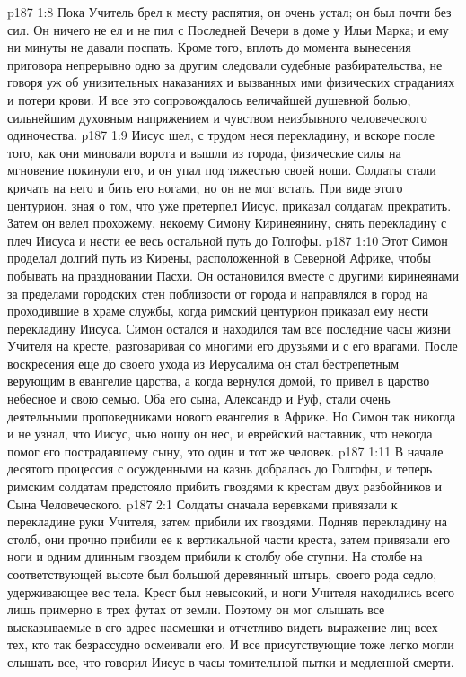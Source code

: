 \vs p187 1:8 Пока Учитель брел к месту распятия, он очень устал; он был почти без сил. Он ничего не ел и не пил с Последней Вечери в доме у Ильи Марка; и ему ни минуты не давали поспать. Кроме того, вплоть до момента вынесения приговора непрерывно одно за другим следовали судебные разбирательства, не говоря уж об унизительных наказаниях и вызванных ими физических страданиях и потери крови. И все это сопровождалось величайшей душевной болью, сильнейшим духовным напряжением и чувством неизбывного человеческого одиночества.
\vs p187 1:9 Иисус шел, с трудом неся перекладину, и вскоре после того, как они миновали ворота и вышли из города, физические силы на мгновение покинули его, и он упал под тяжестью своей ноши. Солдаты стали кричать на него и бить его ногами, но он не мог встать. При виде этого центурион, зная о том, что уже претерпел Иисус, приказал солдатам прекратить. Затем он велел прохожему, некоему Симону Киринеянину, снять перекладину с плеч Иисуса и нести ее весь остальной путь до Голгофы.
\vs p187 1:10 \pc Этот Симон проделал долгий путь из Кирены, расположенной в Северной Африке, чтобы побывать на праздновании Пасхи. Он остановился вместе с другими киринеянами за пределами городских стен поблизости от города и направлялся в город на проходившие в храме службы, когда римский центурион приказал ему нести перекладину Иисуса. Симон остался и находился там все последние часы жизни Учителя на кресте, разговаривая со многими его друзьями и с его врагами. После воскресения еще до своего ухода из Иерусалима он стал бестрепетным верующим в евангелие царства, а когда вернулся домой, то привел в царство небесное и свою семью. Оба его сына, Александр и Руф, стали очень деятельными проповедниками нового евангелия в Африке. Но Симон так никогда и не узнал, что Иисус, чью ношу он нес, и еврейский наставник, что некогда помог его пострадавшему сыну, это один и тот же человек.
\vs p187 1:11 \pc В начале десятого процессия с осужденными на казнь добралась до Голгофы, и теперь римским солдатам предстояло прибить гвоздями к крестам двух разбойников и Сына Человеческого.
\vs p187 2:1 Солдаты сначала веревками привязали к перекладине руки Учителя, затем прибили их гвоздями. Подняв перекладину на столб, они прочно прибили ее к вертикальной части креста, затем привязали его ноги и одним длинным гвоздем прибили к столбу обе ступни. На столбе на соответствующей высоте был большой деревянный штырь, своего рода седло, удерживающее вес тела. Крест был невысокий, и ноги Учителя находились всего лишь примерно в трех футах от земли. Поэтому он мог слышать все высказываемые в его адрес насмешки и отчетливо видеть выражение лиц всех тех, кто так безрассудно осмеивали его. И все присутствующие тоже легко могли слышать все, что говорил Иисус в часы томительной пытки и медленной смерти.

